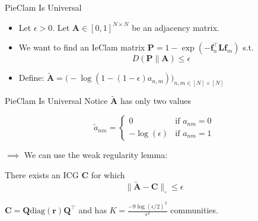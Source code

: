 \documentclass{beamer}
\begin{document}
\begin{frame}{PieClam Is Universal}
\begin{itemize}[itemsep=20pt]
\item Let $\epsilon>0$. Let $\mathbf{A}\in[0,1]^{N\times N}$ be an adjacency matrix. 
\item We want to find an IeClam matrix $\mathbf{P} = 1-\exp(-\mathbf{f}_n^{\top}\mathbf{L}\mathbf{f}_m)$ s.t. \[D(\mathbf{P}\|\mathbf{A}) \leq \epsilon\]
\item Define:  $\tilde{\mathbf{A}} = \Big(-\log(1-(1-\epsilon)a_{n,m})\Big)_{n,m \in [N]\times[N]}$ 
\end{itemize}

\end{frame}

\begin{frame}{PieClam Is Universal}
    Notice $\tilde{\mathbf{A}}$ has only two values
    
    \begin{equation*}
    \tilde{a}_{nm} = \begin{cases}
    0 & \text{if } a_{nm} = 0\\
    -\log(\epsilon) & \text{if } a_{nm} = 1
    \end{cases}
    \end{equation*}

    $\implies$ We can use the weak regularity lemma:
    \begin{center}  
    There exists an ICG $\mathbf{C}$ for which \[ \|\tilde{\mathbf{A}}-\mathbf{C}\|_{\square} \leq \epsilon\]
    
     $\mathbf{C}= \mathbf{Q} \text{diag}(\mathbf{r})\mathbf{Q}^\top$ and has $K=\frac{-9\log(\epsilon/2)^2}{\epsilon^2}$ communities.
    \end{center}
\end{frame}
\end{document}
